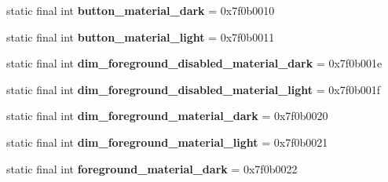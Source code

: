\begin{DoxyCompactItemize}
\item 
\hypertarget{classandroid_1_1support_1_1v7_1_1appcompat_1_1_r_1_1color_a5d1d5941ab6420731c5843ae63fe0789}{}static final int {\bfseries button\+\_\+material\+\_\+dark} = 0x7f0b0010\label{classandroid_1_1support_1_1v7_1_1appcompat_1_1_r_1_1color_a5d1d5941ab6420731c5843ae63fe0789}

\item 
\hypertarget{classandroid_1_1support_1_1v7_1_1appcompat_1_1_r_1_1color_a0f55ddca8d19bdc92c55d9e24598b13c}{}static final int {\bfseries button\+\_\+material\+\_\+light} = 0x7f0b0011\label{classandroid_1_1support_1_1v7_1_1appcompat_1_1_r_1_1color_a0f55ddca8d19bdc92c55d9e24598b13c}

\item 
\hypertarget{classandroid_1_1support_1_1v7_1_1appcompat_1_1_r_1_1color_a9ad8f0e9c7d60cc65f1e0be267909069}{}static final int {\bfseries dim\+\_\+foreground\+\_\+disabled\+\_\+material\+\_\+dark} = 0x7f0b001e\label{classandroid_1_1support_1_1v7_1_1appcompat_1_1_r_1_1color_a9ad8f0e9c7d60cc65f1e0be267909069}

\item 
\hypertarget{classandroid_1_1support_1_1v7_1_1appcompat_1_1_r_1_1color_a73560b92d6f0a6237771fa45d9043f04}{}static final int {\bfseries dim\+\_\+foreground\+\_\+disabled\+\_\+material\+\_\+light} = 0x7f0b001f\label{classandroid_1_1support_1_1v7_1_1appcompat_1_1_r_1_1color_a73560b92d6f0a6237771fa45d9043f04}

\item 
\hypertarget{classandroid_1_1support_1_1v7_1_1appcompat_1_1_r_1_1color_a7c7a0aed93dcef9ce70bae142c8c1686}{}static final int {\bfseries dim\+\_\+foreground\+\_\+material\+\_\+dark} = 0x7f0b0020\label{classandroid_1_1support_1_1v7_1_1appcompat_1_1_r_1_1color_a7c7a0aed93dcef9ce70bae142c8c1686}

\item 
\hypertarget{classandroid_1_1support_1_1v7_1_1appcompat_1_1_r_1_1color_a12eb2c3fd6ba2ffd247cebc75ac00b5c}{}static final int {\bfseries dim\+\_\+foreground\+\_\+material\+\_\+light} = 0x7f0b0021\label{classandroid_1_1support_1_1v7_1_1appcompat_1_1_r_1_1color_a12eb2c3fd6ba2ffd247cebc75ac00b5c}

\item 
\hypertarget{classandroid_1_1support_1_1v7_1_1appcompat_1_1_r_1_1color_a0e92ea4a646c7265ffc07bb24b37a159}{}static final int {\bfseries foreground\+\_\+material\+\_\+dark} = 0x7f0b0022\label{classandroid_1_1support_1_1v7_1_1appcompat_1_1_r_1_1color_a0e92ea4a646c7265ffc07bb24b37a159}


\end{DoxyCompactItemize}
